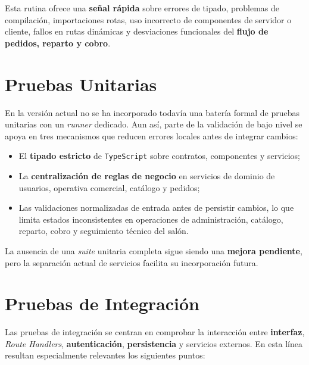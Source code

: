 Esta rutina ofrece una \textbf{señal rápida} sobre errores de tipado, problemas de compilación, importaciones rotas, uso incorrecto de componentes de servidor o cliente, fallos en rutas dinámicas y desviaciones funcionales del \textbf{flujo de pedidos, reparto y cobro}.

\section{Pruebas Unitarias}

En la versión actual no se ha incorporado todavía una batería formal de pruebas unitarias con un \textit{runner} dedicado. Aun así, parte de la validación de bajo nivel se apoya en tres mecanismos que reducen errores locales antes de integrar cambios:

\begin{itemize}
    \item El \textbf{tipado estricto} de \texttt{TypeScript} sobre contratos, componentes y servicios;
    \item La \textbf{centralización de reglas de negocio} en servicios de dominio de usuarios, operativa comercial, catálogo y pedidos;
    \item Las validaciones normalizadas de entrada antes de persistir cambios, lo que limita estados inconsistentes en operaciones de administración, catálogo, reparto, cobro y seguimiento técnico del salón.
\end{itemize}

La ausencia de una \textit{suite} unitaria completa sigue siendo una \textbf{mejora pendiente}, pero la separación actual de servicios facilita su incorporación futura.

\section{Pruebas de Integración}

Las pruebas de integración se centran en comprobar la interacción entre \textbf{interfaz}, \textit{Route Handlers}, \textbf{autenticación}, \textbf{persistencia} y servicios externos. En esta línea resultan especialmente relevantes los siguientes puntos:

